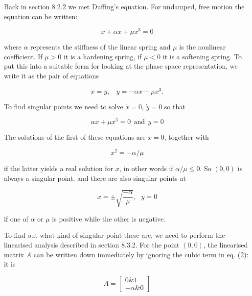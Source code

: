   Back in section 8.2.2 we met Duffing's equation. For undamped, free motion 
  the equation can be written: 

  \begin{equation*}\ddot{x} +\alpha x +\mu x^3 = 0 \tag{1}\end{equation*} 

  \noindent{}where $\alpha$ represents the stiffness of the linear spring and 
  $\mu$ is the nonlinear coefficient. If $\mu > 0$ it is a hardening spring, if 
  $\mu < 0$ it is a softening spring. To put this into a suitable form for 
  looking at the phase space representation, we write it as the pair of 
  equations 

  \begin{equation*}\dot{x}=y \mathrm{,~~~~}\dot{y}=-\alpha x -\mu x^3 . 
  \tag{2}\end{equation*} 

  To find singular points we need to solve $\dot{x}=0$, $\dot{y}=0$ so that 

  \begin{equation*}\alpha x +\mu x^3 = 0 \mathrm{~~and~~} y=0 
  \tag{3}\end{equation*} 

  The solutions of the first of these equations are $x=0$, together with 

  \begin{equation*}x^2=-\alpha / \mu \tag{4}\end{equation*} 

  \noindent{}if the latter yields a real solution for $x$, in other words if 
  $\alpha / \mu \le 0$. So $(0,0)$ is always a singular point, and there are 
  also singular points at 

  \begin{equation*}x=\pm \sqrt{\dfrac{-\alpha}{\mu}} \mathrm{,~~~} y=0 
  \tag{5}\end{equation*} 

  \noindent{}if one of $\alpha$ or $\mu$ is positive while the other is 
  negative. 

  To find out what kind of singular point these are, we need to perform the 
  linearised analysis described in section 8.3.2. For the point $(0,0)$, the 
  linearised matrix $A$ can be written down immediately by ignoring the cubic 
  term in eq. (2): it is 

  \begin{equation*}A=\begin{bmatrix}0 \& 1\\ -\alpha \& 0\end{bmatrix} 
  \tag{6}\end{equation*} 

